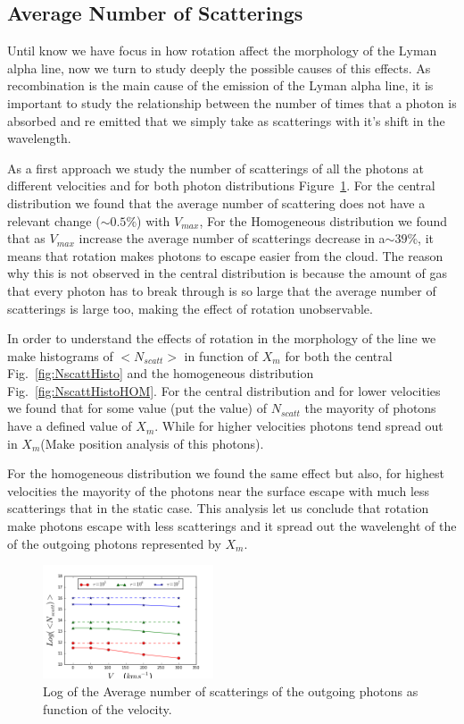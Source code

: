 \documentclass[usenatbib]{mn2e}
\begin{document}
\subsection{Average Number of Scatterings}

Until know we have focus in how rotation affect the morphology of the 
Lyman alpha line, now we turn to study deeply the possible causes of 
this effects. As recombination is the main cause of the emission of the 
Lyman alpha line, it is important to study the relationship between the 
number of times that a photon is absorbed and re emitted that we simply 
take as scatterings with it's shift in the wavelength. 

As a first approach we study the number of scatterings of all the photons 
at different velocities and for both photon distributions Figure~\ref{fig:Nscatt}. 
For the central distribution we found that the average number of scattering 
does not have a relevant change ($\sim 0.5\%$) with $V_{max}$, For the 
Homogeneous distribution we found that as $V_{max}$ increase the average 
number of scatterings decrease in a$\sim 39\%$, it means that rotation 
makes photons to escape easier from the cloud. The reason why this is not 
observed in the central distribution is because the amount of gas that every 
photon has to break through is so large that the average number of scatterings 
is large too, making the effect of rotation unobservable.

In order to understand the effects of rotation in the morphology of the line
 we make histograms of $<N_{scatt}>$  in function of $X_{m}$ for both the 
 central Fig.~\ref{fig:NscattHisto} and the  homogeneous distribution 
 Fig.~\ref{fig:NscattHistoHOM}. For the central distribution and for lower 
 velocities we found that for some value (put the value) of $N_{scatt}$ the 
 mayority of photons have a defined value of $X_{m}$. While for higher 
 velocities photons tend spread out in $X_{m}$(Make position analysis of 
 this photons).

For the homogeneous distribution we found the same effect but also, for 
highest velocities the mayority of the photons near the surface escape 
with much less scatterings that in the static case. This analysis let us 
conclude that rotation make photons escape with less scatterings and it 
spread out the wavelenght of the of the outgoing photons represented by $X_{m}$.


\begin{figure}
    \includegraphics[width=0.45\textwidth]{NscattvsVmax.png}
\caption{Log of the Average number of scatterings of the outgoing
  photons as function of the velocity. \label{fig:Nscatt}}  
\end{figure}
\end{document}
